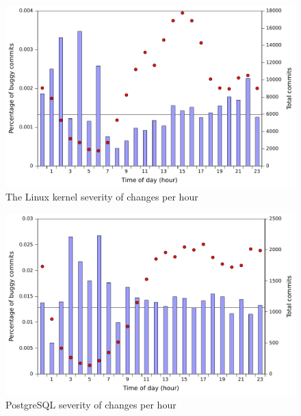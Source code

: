 \begin{figure}
\begin{center}
\includegraphics[width=\columnwidth]{linux-severity-hour.pdf}
\end{center}
\caption{The Linux kernel severity of changes per hour}
\label{fig-linux-severity-hour}
\end{figure}

\begin{figure}
\begin{center}
\includegraphics[width=\columnwidth]{postgresql-severity-hour.pdf}
\end{center}
\caption{PostgreSQL severity of changes per hour}
\label{fig-postgresql-severity-hour}
\end{figure}

